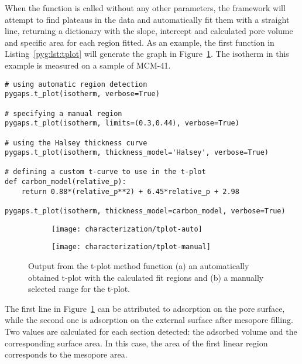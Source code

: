 When the function is called without any other parameters, 
the framework will attempt to find plateaus in the data and 
automatically fit them with a straight line, returning a dictionary
with the slope, intercept and calculated pore volume and specific area
for each region fitted. As an example, the first function in
Listing~\ref{pyg:lst:tplot} will generate the graph in 
Figure~\ref{pyg:fgr:tplot-auto}. The isotherm in this example is measured
on a sample of MCM-41.

\begin{lstlisting}[caption={Generating a t-plot},label={pyg:lst:tplot}]
# using automatic region detection
pygaps.t_plot(isotherm, verbose=True)

# specifying a manual region
pygaps.t_plot(isotherm, limits=(0.3,0.44), verbose=True)

# using the Halsey thickness curve
pygaps.t_plot(isotherm, thickness_model='Halsey', verbose=True)

# defining a custom t-curve to use in the t-plot
def carbon_model(relative_p):
	return 0.88*(relative_p**2) + 6.45*relative_p + 2.98

pygaps.t_plot(isotherm, thickness_model=carbon_model, verbose=True)
\end{lstlisting}

\begin{figure}[h!]
	\centering

    \begin{subfigure}{0.4\linewidth}
        \parbox[c]{0.1\linewidth}{\caption{}%
            \label{pyg:fgr:tplot-auto}}
        \parbox[b]{0.7\linewidth}{%
            \texttt{[image: characterization/tplot-auto]}}
    \end{subfigure}
    \begin{subfigure}{0.4\linewidth}
        \parbox[c]{0.1\linewidth}{\caption{}%
            \label{pyg:fgr:tplot-manual}}
        \parbox[b]{0.7\linewidth}{%
            \texttt{[image: characterization/tplot-manual]}}
    \end{subfigure}

	\caption{Output from the t-plot method function (a) an automatically 
	obtained t-plot with the calculated fit regions and (b) a manually
	selected range for the t-plot.}%
    \label{pyg:fgr:tplot}

\end{figure}

The first line in Figure~\ref{pyg:fgr:tplot-auto} can be attributed 
to adsorption on the pore surface, 
while the second one is adsorption on the external surface after mesopore 
filling. Two values are calculated for each section detected: the adsorbed
volume and the corresponding surface area. In this case, the area of the 
first linear region corresponds to the mesopore area. 

